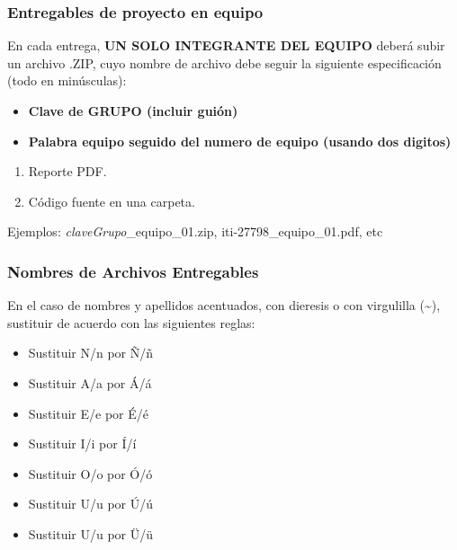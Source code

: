 \begin{frame}
\frametitle{Entregables de proyecto en equipo}
En cada entrega, \textbf{UN SOLO INTEGRANTE DEL EQUIPO} deberá subir un archivo .ZIP, cuyo nombre de archivo debe seguir la siguiente especificación (todo en minúsculas):
\begin{itemize}
\item \textbf{Clave de GRUPO (incluir guión)}
\item \textbf{Palabra equipo seguido del numero de equipo (usando dos digitos)}
\end{itemize}

\begin{enumerate}
\item Reporte PDF.
\item Código fuente en una carpeta.
\end{enumerate}
Ejemplos: \textit{claveGrupo}\_equipo\_01.zip, iti-27798\_equipo\_01.pdf, etc
\end{frame}

\begin{frame}
\frametitle{Nombres de Archivos Entregables}
En el caso de nombres y apellidos acentuados, con dieresis o con virgulilla (\textasciitilde{}), sustituir de acuerdo con las siguientes reglas:
\begin{itemize}
\item Sustituir N/n por \~N/\~n
\item Sustituir A/a por \'A/\'a
\item Sustituir E/e por \'E/\'e
\item Sustituir I/i por \'I/\'i
\item Sustituir O/o por \'O/\'o
\item Sustituir U/u por \'U/\'u
\item Sustituir U/u por \"U/\"u
\end{itemize}
\end{frame}
